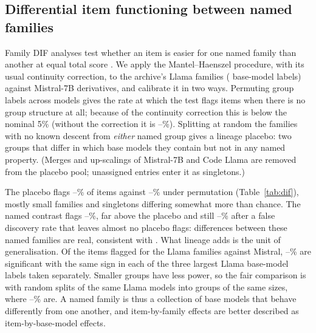 \documentclass[10pt]{article}
\theoremstyle{remark}\newtheorem{remark}{Remark}
\begin{document}
\subsection{Differential item functioning between named families}\label{sec:dif}
Family DIF analyses test whether an item is easier for one named family than
another at equal total score \citep{dif2026llm,neartied2026rankings}. We apply
the Mantel--Haenszel procedure, with its usual continuity correction, to the
archive's Llama families (\DifLlamaBases{} base-model labels) against
Mistral-7B derivatives, and calibrate it in two ways. Permuting group labels
across models gives the rate at which the test flags items when there is no
group structure at all; because of the continuity correction this is below
the nominal 5\% (without the correction it is
\DifPermNoCCMin--\DifPermNoCCMax\%). Splitting at random the families with no
known descent from \emph{either} named group gives a lineage placebo: two
groups that differ in which base models they contain but not in any named
property. (Merges and up-scalings of Mistral-7B and Code Llama are removed
from the placebo pool; unassigned entries enter it as singletons.)

The placebo flags \DifPlaceboMin--\DifPlaceboMax\% of items against
\DifPermMin--\DifPermMax\% under permutation (Table~\ref{tab:dif}), mostly
small families and singletons differing somewhat more than chance. The named
contrast flags \DifNamedMin--\DifNamedMax\%, far above the placebo and still
\DifNamedFdrMin--\DifNamedFdrMax\% after a false discovery rate that leaves
almost no placebo flags: differences between these named families are real,
consistent with \citet{dif2026llm}. What lineage adds is the unit of
generalisation. Of the items flagged for the Llama families against Mistral,
\DifRepMin--\DifRepMax\% are significant with the same sign in each of the
three largest Llama base-model labels taken separately. Smaller groups have
less power, so the fair comparison is with random splits of the same Llama
models into groups of the same sizes, where \DifRepNullMin--\DifRepNullMax\%
are. A named family is thus a collection of base models that behave
differently from one another, and item-by-family effects are better described
as item-by-base-model effects.
\end{document}
